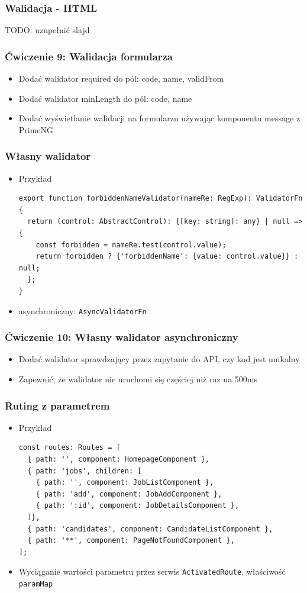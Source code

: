 \documentclass{beamer}
\begin{document}
\begin{frame}
    \frametitle{Walidacja - HTML}
    TODO: uzupełnić slajd
\end{frame}

\begin{frame}
    \frametitle{Ćwiczenie 9: Walidacja formularza}
    \begin{itemize}
        \item Dodać walidator required do pól: code, name, validFrom
        \item Dodać walidator minLength do pól: code, name
        \item Dodać wyświetlanie walidacji na formularzu używając komponentu message z PrimeNG
    \end{itemize}
\end{frame}

\begin{frame}[fragile]
    \frametitle{Własny walidator}
    \begin{itemize}
        \item Przykład
\begin{lstlisting}
export function forbiddenNameValidator(nameRe: RegExp): ValidatorFn {
  return (control: AbstractControl): {[key: string]: any} | null => {
    const forbidden = nameRe.test(control.value);
    return forbidden ? {'forbiddenName': {value: control.value}} : null;
  };
}
\end{lstlisting}
        \item asynchroniczny: \lstinline{AsyncValidatorFn}
    \end{itemize}
\end{frame}

\begin{frame}
    \frametitle{Ćwiczenie 10: Własny walidator asynchroniczny}
    \begin{itemize}
        \item Dodać walidator sprawdzający przez zapytanie do API, czy kod jest unikalny
        \item Zapewnić, że walidator nie uruchomi się częściej niż raz na 500ms
    \end{itemize}
\end{frame}

\begin{frame}[fragile]
    \frametitle{Ruting z parametrem}
    \begin{itemize}
        \item Przykład
\begin{lstlisting}
const routes: Routes = [
  { path: '', component: HomepageComponent },
  { path: 'jobs', children: [
    { path: '', component: JobListComponent },
    { path: 'add', component: JobAddComponent },
    { path: ':id', component: JobDetailsComponent },
  ]},
  { path: 'candidates', component: CandidateListComponent },
  { path: '**', component: PageNotFoundComponent },
];
\end{lstlisting}
        \item Wyciąganie wartości parametru przez serwis \lstinline{ActivatedRoute}, właściwość \lstinline{paramMap}
    \end{itemize}
\end{frame}
\end{document}
